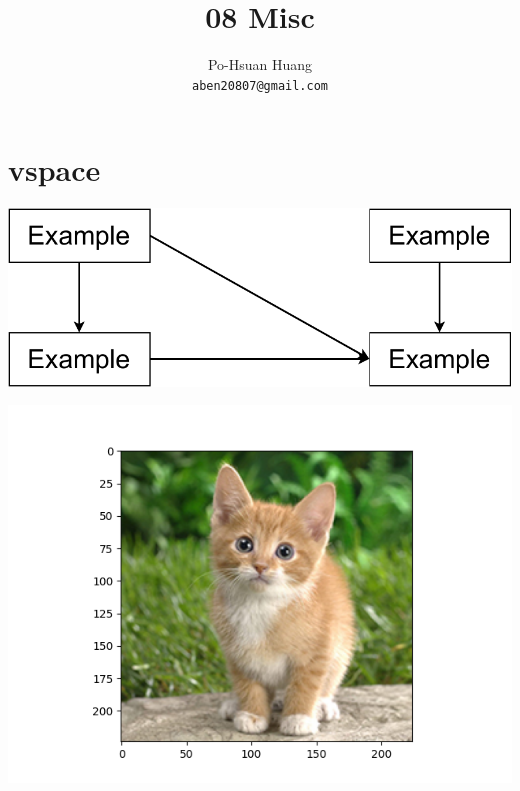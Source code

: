 \documentclass[12pt, a4paper]{article}
\title{08 Misc}
\author{Po-Hsuan Huang\\ 
    \texttt{aben20807@gmail.com}
}
\begin{document}
\maketitle

\section{vspace}

\begin{table}[!h]
    \centering
    \begin{minipage}[t]{.48\linewidth}
        \includegraphics[width=\linewidth]{figures/paper-example.pdf}
        \vspace{-10pt}
        \label{fig:A}
    \end{minipage}
    \qquad
    \begin{minipage}[t]{.44\linewidth}
        \includegraphics[width=\linewidth]{figures/cat.png}
        \vspace{10pt}
        \label{fig:B}
    \end{minipage}
\end{table}
\end{document}
